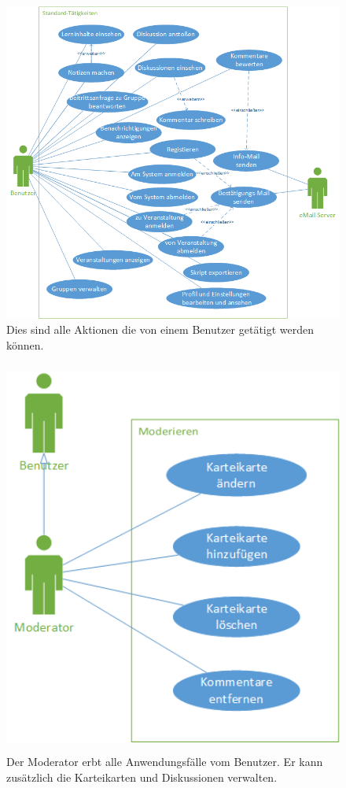 \documentclass[12pt,a4paper]{article}
\begin{document}
\begin{figure}[H]
	\centering
	\includegraphics[width=\textwidth]{Bilder/Anwendungsfalldiagramme/Benutzer.png}
	\caption{Dies sind alle Aktionen die von einem Benutzer getätigt werden können.}
	\label{AwfBenutzer}
\end{figure}

\begin{figure}[H]
	\centering
	\includegraphics[height=13cm]{Bilder/Anwendungsfalldiagramme/Moderator.png}
	\caption{Der Moderator erbt alle Anwendungsfälle vom Benutzer. Er kann zusätzlich die Karteikarten und Diskussionen verwalten.}
	\label{AwfModerator}
\end{figure}
\end{document}
